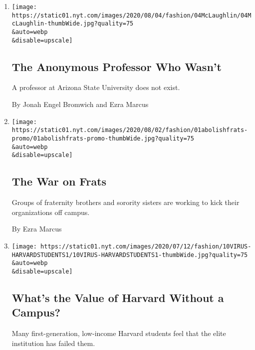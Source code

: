 \begin{enumerate}
\def\labelenumi{\arabic{enumi}.}
\item
  \href{/2020/08/04/style/college-coronavirus-hoax.html}{}

  \texttt{[image: https://static01.nyt.com/images/2020/08/04/fashion/04McLaughlin/04McLaughlin-thumbWide.jpg?quality=75\\\&auto=webp\\\&disable=upscale]}

  \hypertarget{the-anonymous-professor-who-wasnt}{%
  \subsection{The Anonymous Professor Who
  Wasn't}\label{the-anonymous-professor-who-wasnt}}

  A professor at Arizona State University does not exist.

  By Jonah Engel Bromwich and Ezra Marcus
\item
  \href{/2020/08/01/style/abolish-greek-life-college-frat-racism.html}{}

  \texttt{[image: https://static01.nyt.com/images/2020/08/02/fashion/01abolishfrats-promo/01abolishfrats-promo-thumbWide.jpg?quality=75\\\&auto=webp\\\&disable=upscale]}

  \hypertarget{the-war-on-frats}{%
  \subsection{The War on Frats}\label{the-war-on-frats}}

  Groups of fraternity brothers and sorority sisters are working to kick
  their organizations off campus.

  By Ezra Marcus
\item
  \href{/2020/07/11/style/harvard-students-coronavirus.html}{}

  \texttt{[image: https://static01.nyt.com/images/2020/07/12/fashion/10VIRUS-HARVARDSTUDENTS1/10VIRUS-HARVARDSTUDENTS1-thumbWide.jpg?quality=75\\\&auto=webp\\\&disable=upscale]}

  \hypertarget{whats-the-value-of-harvard-without-a-campus}{%
  \subsection{What's the Value of Harvard Without a
  Campus?}\label{whats-the-value-of-harvard-without-a-campus}}

  Many first-generation, low-income Harvard students feel that the elite
  institution has failed them.


\end{enumerate}
